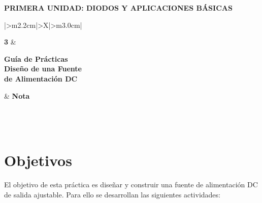 \documentclass[11pt,a4paper]{article}
\begin{document}
\begin{center}
    {\normalsize\bfseries PRIMERA UNIDAD: DIODOS Y APLICACIONES BÁSICAS}
\end{center}

\vspace{0.55cm}

\begingroup
\renewcommand{\tabularxcolumn}[1]{m{#1}}
\renewcommand{\arraystretch}{2.0}
\setlength{\tabcolsep}{12pt}
\noindent
\begin{tabularx}{\textwidth}{|>{\centering\arraybackslash}m{2.2cm}|>{\centering\arraybackslash}X|>{\centering\arraybackslash}m{3.0cm}|}
\hline
\rule{0pt}{2.1cm}{\fontsize{58}{58}\selectfont\bfseries 3}
    & \begin{minipage}[c]{\linewidth}\centering
          {\large\bfseries Guía de Prácticas}\\[7pt]
          {\Large\bfseries Diseño de una Fuente\\ de Alimentación DC}
      \end{minipage}
    & {\Large\bfseries Nota}\\
\hline
{}\\
\hline
{}\\
\\
\hline
\end{tabularx}
\endgroup

\vspace{0.8cm}

\section{Objetivos}
El objetivo de esta práctica es diseñar y construir una fuente de
alimentación DC de salida ajustable. Para ello se desarrollan las siguientes actividades:
\end{document}
